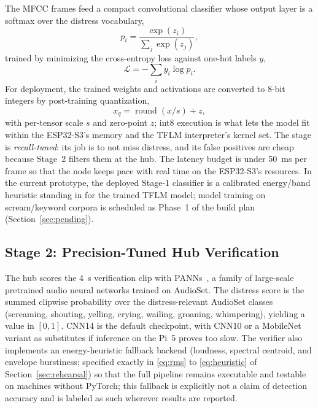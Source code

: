 \documentclass[journal]{IEEEtran}
\begin{document}
The MFCC frames feed a compact convolutional classifier whose output layer
is a softmax over the distress vocabulary,
\begin{equation}
\label{eq:softmax}
p_i = \frac{\exp(z_i)}{\sum_{j} \exp(z_j)},
\end{equation}
trained by minimizing the cross-entropy loss against one-hot labels $y$,
\begin{equation}
\label{eq:crossentropy}
\mathcal{L} = -\sum_{i} y_i \log p_i .
\end{equation}
For deployment, the trained weights and activations are converted to 8-bit
integers by post-training quantization,
\begin{equation}
\label{eq:quantization}
x_q = \operatorname{round}(x/s) + z,
\end{equation}
with per-tensor scale $s$ and zero-point $z$; int8 execution is what lets
the model fit within the ESP32-S3's memory and the TFLM interpreter's kernel
set. The stage is \emph{recall-tuned}: its job is to not
miss distress, and its false positives are cheap because Stage~2 filters
them at the hub. The latency budget is under 50~ms per frame so that the
node keeps pace with real time on the ESP32-S3's resources. In the current
prototype, the deployed Stage-1 classifier is a calibrated energy/band
heuristic standing in for the trained TFLM model; model training on
scream/keyword corpora is scheduled as Phase~1 of the build plan
(Section~\ref{sec:pending}).

\subsection{Stage 2: Precision-Tuned Hub Verification}

The hub scores the 4~s verification clip with PANNs~\cite{kong2020}, a
family of large-scale pretrained audio neural networks trained on AudioSet.
The distress score is the summed clipwise probability over the
distress-relevant AudioSet classes (screaming, shouting, yelling, crying,
wailing, groaning, whimpering), yielding a value in $[0, 1]$. CNN14 is the
default checkpoint, with CNN10 or a MobileNet variant as substitutes if
inference on the Pi~5 proves too slow. The verifier also implements an
energy-heuristic fallback backend (loudness, spectral centroid, and envelope
burstiness; specified exactly in
\eqref{eq:rms} to \eqref{eq:heuristic} of Section~\ref{sec:rehearsal}) so that
the full pipeline remains executable and testable on machines without
PyTorch; this fallback is explicitly not a claim of detection accuracy and
is labeled as such wherever results are reported.
\end{document}
